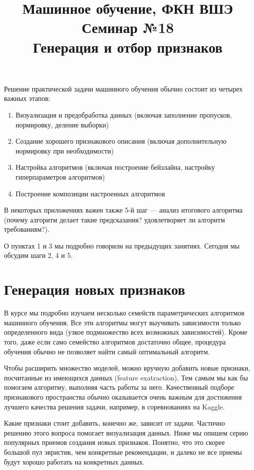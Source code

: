 \documentclass[12pt,a4paper]{article}
\title{Машинное обучение, ФКН ВШЭ\\Семинар №18\\Генерация и отбор признаков}
\author{}
\date{}
\begin{document}
	\maketitle
	Решение практической задачи машинного обучения обычно состоит из четырех  важных этапов:
	\begin{enumerate}
		\item Визуализация и предобработка данных (включая заполнение пропусков, нормировку, деление выборки)
		\item Создание хорошего признакового описания (включая дополнительную нормировку при необходимости)
		\item Настройка алгоритмов (включая построение бейзлайна, настройку гиперпараметров алгоритмов)
		\item Построение композиции настроенных алгоритмов
	\end{enumerate}
    В некоторых приложениях важен также 5-й шаг --- анализ итогового алгоритма (почему алгоритм делает такие предсказания? удовлетворяет ли алгоритм требованиям?).
    
    О пунктах 1 и 3 мы подробно говорили на предыдущих занятиях. Сегодня мы обсудим шаги 2, 4 и 5.
    
	\section{Генерация новых признаков}
	В курсе мы подробно изучаем несколько семейств параметрических алгоритмов машинного обучения. Все эти алгоритмы могут выучивать зависимости только определенного вида (узкое подмножество всех возможных зависимостей). Кроме того, даже если само семейство алгоритмов достаточно общее, процедура обучения обычно не позволяет найти самый оптимальный алгоритм. 
	
	Чтобы расширить множество моделей, можно вручную добавить новые признаки, посчитанные из имеющихся данных (feature exatraction). Тем самым мы как бы помогаем алгоритму, выполняя часть работы за него. Качественный подборе признакового пространства обычно оказывается очень важным для достижения лучшего качества решения задачи, например, в соревнованиях на Kaggle.
	
	 Какие признаки стоит добавить, конечно же, зависит от задачи. Частично решению этого вопроса помогает визуализация данных. Ниже мы опишем серию популярных приемов создания новых признаков. Понятно, что это скорее большой пул эвристик, чем конкретные рекомендации, и далеко не все приемы будут хорошо работать на конкретных данных.
	 
\end{document}
